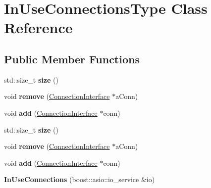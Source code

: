 \hypertarget{class_in_use_connections_type}{}\section{In\+Use\+Connections\+Type Class Reference}
\label{class_in_use_connections_type}
\subsection*{Public Member Functions}
\begin{DoxyCompactItemize}
\item 
\mbox{\label{class_in_use_connections_type_a0dc7ed043e59287fac24b3828dcd5ec6}} 
std\+::size\+\_\+t {\bfseries size} ()
\item 
\mbox{\label{class_in_use_connections_type_a70a45d1639a736696231e44cb60df098}} 
void {\bfseries remove} (\hyperlink{class_connection_interface}{Connection\+Interface} $\ast$a\+Conn)
\item 
\mbox{\label{class_in_use_connections_type_a357a86a5de5b8c606f25870d636b0027}} 
void {\bfseries add} (\hyperlink{class_connection_interface}{Connection\+Interface} $\ast$conn)
\item 
\mbox{\label{class_in_use_connections_type_a0dc7ed043e59287fac24b3828dcd5ec6}} 
std\+::size\+\_\+t {\bfseries size} ()
\item 
\mbox{\label{class_in_use_connections_type_a70a45d1639a736696231e44cb60df098}} 
void {\bfseries remove} (\hyperlink{class_connection_interface}{Connection\+Interface} $\ast$a\+Conn)
\item 
\mbox{\label{class_in_use_connections_type_a357a86a5de5b8c606f25870d636b0027}} 
void {\bfseries add} (\hyperlink{class_connection_interface}{Connection\+Interface} $\ast$conn)
\item 
\mbox{\label{class_in_use_connections_type_a62e83cf6e070093e56e1fe1c3bd21fda}} 
{\bfseries In\+Use\+Connections} (boost\+::asio\+::io\+\_\+service \&io)
\item 

\end{DoxyCompactItemize}
